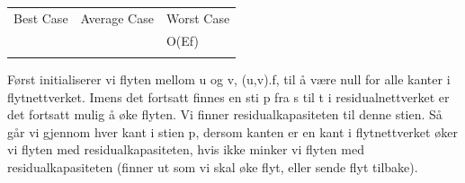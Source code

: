 \documentclass[12pt]{report}
\begin{document}


\begin{table}[H]
 			\centering
\begin{tabular}{p{1.75in}p{2.41in}p{1.91in}}
\hline
\multicolumn{1}{p{1.75in}}{{\fontsize{13pt}{15.6pt}\selectfont Best Case}} & 
\multicolumn{1}{p{2.41in}}{{\fontsize{13pt}{15.6pt}\selectfont Average Case}} & 
\multicolumn{1}{p{1.91in}}{{\fontsize{13pt}{15.6pt}\selectfont Worst Case}} \\
\hhline{---}
\multicolumn{1}{p{1.75in}}{{\fontsize{14pt}{16.8pt}\selectfont O \(  \left( VE^{3} \right)  \)  }} & 
\multicolumn{1}{p{2.41in}}{} & 
\multicolumn{1}{p{1.91in}}{{\fontsize{14pt}{16.8pt}\selectfont O(E{\fontsize{10pt}{12.0pt}\selectfont f{\fontsize{14pt}{16.8pt}\selectfont )}}}} \\
\hhline{---}

\end{tabular}
 \end{table}




\vspace{\baselineskip}
Først initialiserer vi flyten mellom u og v, (u,v).f, til å være null for alle kanter i flytnettverket. Imens det fortsatt finnes en sti p fra s til t i residualnettverket er det fortsatt mulig å øke flyten. Vi finner residualkapasiteten til denne stien. Så går vi gjennom hver kant i stien p, dersom kanten er en kant i flytnettverket øker vi flyten med residualkapasiteten, hvis ikke minker vi flyten med residualkapasiteten (finner ut som vi skal øke flyt, eller sende flyt tilbake). \par


\vspace{\baselineskip}


\end{document}
